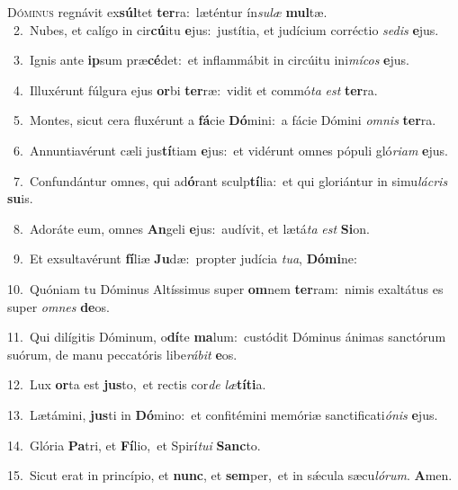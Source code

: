 \lettrine{\initial\textcolor{\initialcolor}{D}}{óminus} regnávit ex\-\textbf{súl}\-tet \textbf{ter}\-ra:~\star læténtur ín\-\textit{su}\-\textit{læ} \textbf{mul}\-tæ.\\
{\numbfont\textcolor{\numbcolor}{~2.}}~Nubes, et calígo in cir\-\textbf{cú}\-itu \textbf{e}\-jus:~\star justítia, et judícium corréctio \textit{se}\-\textit{dis} \textbf{e}\-jus.\par
{\numbfont\textcolor{\numbcolor}{~3.}}~Ignis ante \textbf{ip}\-sum præ\-\textbf{cé}\-det:~\star et inflammábit in circúitu ini\-\textit{mí}\-\textit{cos} \textbf{e}\-jus.\par
{\numbfont\textcolor{\numbcolor}{~4.}}~Illuxérunt fúlgura ejus \textbf{or}\-bi \textbf{ter}\-ræ:~\star vidit et commó\textit{ta} \textit{est} \textbf{ter}\-ra.\par
{\numbfont\textcolor{\numbcolor}{~5.}}~Montes, sicut cera fluxérunt a \textbf{fá}\-cie \textbf{Dó}\-mini:~\star a fácie Dómini \textit{om}\-\textit{nis} \textbf{ter}\-ra.\par
{\numbfont\textcolor{\numbcolor}{~6.}}~Annuntiavérunt cæli jus\-\textbf{tí}\-tiam \textbf{e}\-jus:~\star et vidérunt omnes pópuli gló\-\textit{ri}\-\textit{am} \textbf{e}\-jus.\par
{\numbfont\textcolor{\numbcolor}{~7.}}~Confundántur omnes, qui ad\-\textbf{ó}\-rant sculp\-\textbf{tí}\-lia:~\star et qui gloriántur in simu\-\textit{lá}\-\textit{cris} \textbf{su}\-is.\par
{\numbfont\textcolor{\numbcolor}{~8.}}~Adoráte eum, omnes \textbf{An}\-geli \textbf{e}\-jus:~\star audívit, et lætá\textit{ta} \textit{est} \textbf{Si}\-on.\par
{\numbfont\textcolor{\numbcolor}{~9.}}~Et exsultavérunt \textbf{fí}\-liæ \textbf{Ju}\-dæ:~\star propter judícia \textit{tu}\-\textit{a}, \textbf{Dó}\-\textbf{mi}ne:\par
{\numbfont\textcolor{\numbcolor}{10.}}~Quóniam tu Dóminus Altíssimus super \textbf{om}\-nem \textbf{ter}\-ram:~\star nimis exaltátus es super \textit{om}\-\textit{nes} \textbf{de}\-os.\par
{\numbfont\textcolor{\numbcolor}{11.}}~Qui dilígitis Dóminum, o\-\textbf{dí}\-te \textbf{ma}\-lum:~\star custódit Dóminus ánimas sanctórum suórum, de manu peccatóris libe\-\textit{rá}\-\textit{bit} \textbf{e}\-os.\par
{\numbfont\textcolor{\numbcolor}{12.}}~Lux \textbf{or}\-ta est \textbf{jus}\-to,~\star et rectis cor\textit{de} \textit{læ}\-\textbf{tí}\textbf{ti}a.\par
{\numbfont\textcolor{\numbcolor}{13.}}~Lætámini, \textbf{jus}\-ti in \textbf{Dó}\-mino:~\star et confitémini memóriæ sanctificati\-\textit{ó}\-\textit{nis} \textbf{e}\-jus.\par
{\numbfont\textcolor{\numbcolor}{14.}}~Glória \textbf{Pa}\-tri, et \textbf{Fí}\-lio,~\star et Spirí\-\textit{tu}\-\textit{i} \textbf{Sanc}\-to.\par
{\numbfont\textcolor{\numbcolor}{15.}}~Sicut erat in princípio, et \textbf{nunc}\-, et \textbf{sem}\-per,~\star et in sǽcula sæcu\-\textit{ló}\-\textit{rum}. \textbf{A}\-men.\par
